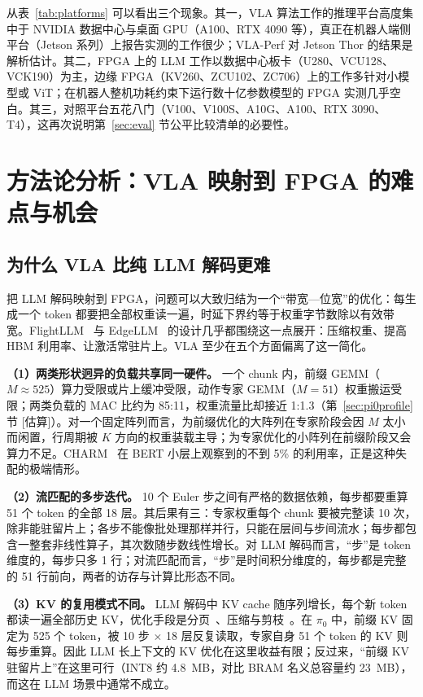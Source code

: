 \documentclass[a4paper,10.5pt]{ctexart}
\newcommand{\tE}{\textsf{[估算]}}           %
\newcommand{\pizero}{$\pi_0$}
\begin{document}
从表~\ref{tab:platforms} 可以看出三个现象。其一，VLA 算法工作的推理平台高度集中于 NVIDIA 数据中心与桌面 GPU（A100、RTX 4090 等），真正在机器人端侧平台（Jetson 系列）上报告实测的工作很少；VLA-Perf 对 Jetson Thor 的结果是解析估计。其二，FPGA 上的 LLM 工作以数据中心板卡（U280、VCU128、VCK190）为主，边缘 FPGA（KV260、ZCU102、ZC706）上的工作多针对小模型或 ViT；在机器人整机功耗约束下运行数十亿参数模型的 FPGA 实测几乎空白。其三，对照平台五花八门（V100、V100S、A10G、A100、RTX 3090、T4），这再次说明第~\ref{sec:eval} 节公平比较清单的必要性。

\section{方法论分析：VLA 映射到 FPGA 的难点与机会}\label{sec:method}

\subsection{为什么 VLA 比纯 LLM 解码更难}

把 LLM 解码映射到 FPGA，问题可以大致归结为一个“带宽—位宽”的优化：每生成一个 token 都要把全部权重读一遍，时延下界约等于权重字节数除以有效带宽。FlightLLM~\cite{flightllm} 与 EdgeLLM~\cite{edgellm} 的设计几乎都围绕这一点展开：压缩权重、提高 HBM 利用率、让激活常驻片上。VLA 至少在五个方面偏离了这一简化。

\textbf{（1）两类形状迥异的负载共享同一硬件。} 一个 chunk 内，前缀 GEMM（$M\approx525$）算力受限或片上缓冲受限，动作专家 GEMM（$M=51$）权重搬运受限；两类负载的 MAC 比约为 85:11，权重流量比却接近 1:1.3（第~\ref{sec:pi0profile} 节 \tE）。对一个固定阵列而言，为前缀优化的大阵列在专家阶段会因 $M$ 太小而闲置，行周期被 $K$ 方向的权重装载主导；为专家优化的小阵列在前缀阶段又会算力不足。CHARM~\cite{charm} 在 BERT 小层上观察到的不到 5\% 的利用率，正是这种失配的极端情形。

\textbf{（2）流匹配的多步迭代。} 10 个 Euler 步之间有严格的数据依赖，每步都要重算 51 个 token 的全部 18 层。其后果有三：专家权重每个 chunk 要被完整读 10 次，除非能驻留片上；各步不能像批处理那样并行，只能在层间与步间流水；每步都包含一整套非线性算子，其次数随步数线性增长。对 LLM 解码而言，“步”是 token 维度的，每步只多 1 行；对流匹配而言，“步”是时间积分维度的，每步都是完整的 51 行前向，两者的访存与计算比形态不同。

\textbf{（3）KV 的复用模式不同。} LLM 解码中 KV cache 随序列增长，每个新 token 都读一遍全部历史 KV，优化手段是分页~\cite{vllm}、压缩与剪枝~\cite{spatten}。在 \pizero{} 中，前缀 KV 固定为 525 个 token，被 10 步 $\times$ 18 层反复读取，专家自身 51 个 token 的 KV 则每步重算。因此 LLM 长上下文的 KV 优化在这里收益有限；反过来，“前缀 KV 驻留片上”在这里可行（INT8 约 4.8~MB，对比 BRAM 名义总容量约 23~MB），而这在 LLM 场景中通常不成立。
\end{document}
